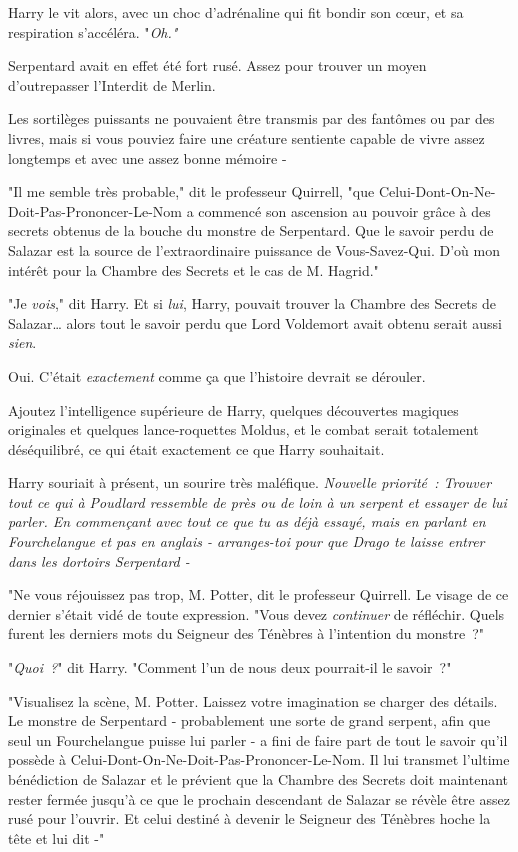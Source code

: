 Harry le vit alors, avec un choc d'adrénaline qui fit bondir son cœur, et sa respiration s'accéléra. "\emph{Oh."}

Serpentard avait en effet été fort rusé. Assez pour trouver un moyen d'outrepasser l'Interdit de Merlin.

Les sortilèges puissants ne pouvaient être transmis par des fantômes ou par des livres, mais si vous pouviez faire une créature sentiente capable de vivre assez longtemps et avec une assez bonne mémoire -

"Il me semble très probable," dit le professeur Quirrell, "que Celui-Dont-On-Ne-Doit-Pas-Prononcer-Le-Nom a commencé son ascension au pouvoir grâce à des secrets obtenus de la bouche du monstre de Serpentard. Que le savoir perdu de Salazar est la source de l'extraordinaire puissance de Vous-Savez-Qui. D'où mon intérêt pour la Chambre des Secrets et le cas de M. Hagrid."

"Je \emph{vois}," dit Harry. Et si \emph{lui}, Harry, pouvait trouver la Chambre des Secrets de Salazar… alors tout le savoir perdu que Lord Voldemort avait obtenu serait aussi \emph{sien}.

Oui. C'était \emph{exactement} comme ça que l'histoire devrait se dérouler.

Ajoutez l'intelligence supérieure de Harry, quelques découvertes magiques originales et quelques lance-roquettes Moldus, et le combat serait totalement déséquilibré, ce qui était exactement ce que Harry souhaitait.

Harry souriait à présent, un sourire très maléfique. \emph{Nouvelle priorité~: Trouver tout ce qui à Poudlard ressemble de près ou de loin à un serpent et essayer de lui parler. En commençant avec tout ce que tu as déjà essayé, mais en parlant en Fourchelangue et pas en anglais - arranges-toi pour que Drago te laisse entrer dans les dortoirs Serpentard -}

"Ne vous réjouissez pas trop, M. Potter, dit le professeur Quirrell. Le visage de ce dernier s'était vidé de toute expression. "Vous devez \emph{continuer} de réfléchir. Quels furent les derniers mots du Seigneur des Ténèbres à l'intention du monstre~?"

"\emph{Quoi~?}" dit Harry. "Comment l'un de nous deux pourrait-il le savoir~?"

"Visualisez la scène, M. Potter. Laissez votre imagination se charger des détails. Le monstre de Serpentard - probablement une sorte de grand serpent, afin que seul un Fourchelangue puisse lui parler - a fini de faire part de tout le savoir qu'il possède à Celui-Dont-On-Ne-Doit-Pas-Prononcer-Le-Nom. Il lui transmet l'ultime bénédiction de Salazar et le prévient que la Chambre des Secrets doit maintenant rester fermée jusqu'à ce que le prochain descendant de Salazar se révèle être assez rusé pour l'ouvrir. Et celui destiné à devenir le Seigneur des Ténèbres hoche la tête et lui dit -"

